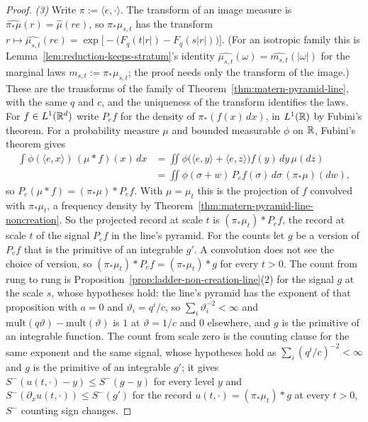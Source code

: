 \begin{proof}
\emph{(3)} Write $\pi := \langle e, \cdot\rangle$. The transform of an image measure is
$\widehat{\pi_*\mu}(r) = \widehat\mu(re)$, so $\pi_*\mu_{s,t}$ has the transform
$r \mapsto \widehat{\mu_{s,t}}(re) = \exp\bigl[-\bigl(F_q(t|r|) - F_q(s|r|)\bigr)\bigr]$. (For an
isotropic family this is Lemma~\ref{lem:reduction-keeps-stratum}'s identity
$\widehat{\mu_{s,t}}(\omega) = \widehat{m_{s,t}}(|\omega|)$ for the marginal laws
$m_{s,t} := \pi_*\mu_{s,t}$; the proof needs only the transform of the image.) These are the
transforms of the family of Theorem~\ref{thm:matern-pyramid-line}, with the same $q$ and $c$, and
the uniqueness of the transform identifies the laws. For $f \in L^1(\mathbb{R}^d)$ write $P_ef$ for the
density of $\pi_*(f(x)\,dx)$, in $L^1(\mathbb{R})$ by Fubini's theorem. For a probability measure $\mu$
and bounded measurable $\phi$ on $\mathbb{R}$, Fubini's theorem gives
\[
  \begin{aligned}
  \int\phi(\langle e, x\rangle)\,(\mu * f)(x)\,dx
   &= \iint\phi\bigl(\langle e, y\rangle + \langle e, z\rangle\bigr)f(y)\,dy\,\mu(dz) \\
   &= \iint\phi(\sigma + w)\,P_ef(\sigma)\,d\sigma\,(\pi_*\mu)(dw) ,
  \end{aligned}
\]
so $P_e(\mu * f) = (\pi_*\mu) * P_ef$. With $\mu = \mu_t$ this is the projection of $f$ convolved with
$\pi_*\mu_t$, a \Polya{} frequency density by Theorem~\ref{thm:matern-pyramid-line-noncreation}.
So the projected record at scale $t$ is $(\pi_*\mu_t) * P_ef$, the record at scale $t$ of the
signal $P_ef$ in the line's \Matern{} pyramid. For the counts let $g$ be a version of $P_ef$ that
is the primitive of an integrable $g'$. A convolution does not see the choice of version, so
$(\pi_*\mu_t) * P_ef = (\pi_*\mu_t) * g$ for every $t > 0$. The count from rung to rung is
Proposition~\ref{prop:ladder-non-creation-line}(2) for the signal $g$ at the scale $s$, whose
hypotheses hold: the line's \Matern{} pyramid has the exponent of that proposition with $a = 0$ and
$\vartheta_i = q^i/c$, so $\sum_i\vartheta_i^{-2} < \infty$ and $\mathrm{mult}(q\vartheta) -
\mathrm{mult}(\vartheta)$ is $1$ at $\vartheta = 1/c$ and $0$ elsewhere, and $g$ is the primitive of
an integrable function. The count from scale zero is the counting clause
 for the same exponent and the same
signal, whose hypotheses hold as $\sum_i(q^i/c)^{-2} < \infty$ and $g$ is the primitive of an
integrable $g'$; it gives $S^-(u(t, \cdot) - y) \le S^-(g - y)$ for every level $y$ and
$S^-(\partial_xu(t, \cdot)) \le S^-(g')$ for the record $u(t, \cdot) = (\pi_*\mu_t) * g$ at every
$t > 0$, $S^-$ counting sign changes.


\end{proof}
